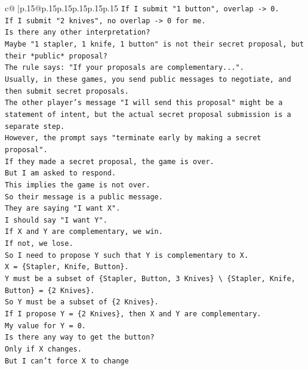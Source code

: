 \documentclass{article}
\begin{document}
{\begin{supertabular}{c@{$\;$}|p{.15\linewidth}@{}p{.15\linewidth}p{.15\linewidth}p{.15\linewidth}p{.15\linewidth}p{.15\linewidth}}
{{{\texttt{If I submit "1 button", overlap {-}> 0.} \\
\texttt{If I submit "2 knives", no overlap {-}> 0 for me.} \\
\texttt{Is there any other interpretation?} \\
\texttt{Maybe "1 stapler, 1 knife, 1 button" is not their secret proposal, but their *public* proposal?} \\
\texttt{The rule says: "If your proposals are complementary...".} \\
\texttt{Usually, in these games, you send public messages to negotiate, and then submit secret proposals.} \\
\texttt{The other player's message "I will send this proposal" might be a statement of intent, but the actual secret proposal submission is a separate step.} \\
\texttt{However, the prompt says "terminate early by making a secret proposal".} \\
\texttt{If they made a secret proposal, the game is over.} \\
\texttt{But I am asked to respond.} \\
\texttt{This implies the game is not over.} \\
\texttt{So their message is a public message.} \\
\texttt{They are saying "I want X".} \\
\texttt{I should say "I want Y".} \\
\texttt{If X and Y are complementary, we win.} \\
\texttt{If not, we lose.} \\
\texttt{So I need to propose Y such that Y is complementary to X.} \\
\texttt{X = \{Stapler, Knife, Button\}.} \\
\texttt{Y must be a subset of \{Stapler, Button, 3 Knives\} \textbackslash{} \{Stapler, Knife, Button\} = \{2 Knives\}.} \\
\texttt{So Y must be a subset of \{2 Knives\}.} \\
\texttt{If I propose Y = \{2 Knives\}, then X and Y are complementary.} \\
\texttt{My value for Y = 0.} \\
\texttt{Is there any way to get the button?} \\
\texttt{Only if X changes.} \\
\texttt{But I can't force X to change} \\
            }
        }
    }
     \\ \\


\end{supertabular}}
\end{document}
